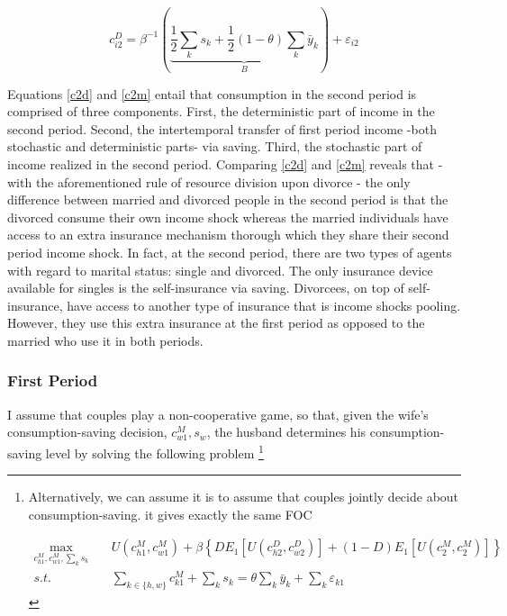 \begin{equation}
c_{i2}^D = \beta^{-1} \left ( \underbrace{\dfrac{1}{2} \sum_k s_k + \dfrac{1}{2} (1-\theta) \sum_k \bar y_k}_{B} \right ) + \varepsilon_{i2} 
\label{c2d}
\end{equation}

Equations \eqref{c2d} and \eqref{c2m} entail that consumption in the second period is comprised of three components. First, the deterministic part of income in the second period. Second, the intertemporal transfer of first period income -both stochastic and deterministic parts- via saving. Third, the stochastic part of income realized in the second period. Comparing \eqref{c2d} and \eqref{c2m}  reveals that - with the aforementioned rule of resource division upon divorce - the only difference between married and divorced people in the second period is that the divorced consume their own income shock whereas the married individuals have access to an extra insurance mechanism thorough which they share their second period income shock. In fact, at the second period, there are two types of agents with regard to marital status: single and divorced. The only insurance device available for singles is the self-insurance via saving. Divorcees, on top of self-insurance, have access to another type of insurance that is income shocks pooling. However, they use this extra insurance at the first period as opposed to the married who use it in both periods.  

\subsubsection{First Period}

I assume that couples play a non-cooperative game, so that, given the wife's consumption-saving decision, $c_{w1}^M, s_w$, the husband determines his consumption-saving level by solving the following problem \footnote{Alternatively, we can assume it is to assume that couples jointly decide about consumption-saving. it gives exactly the same FOC 

\begin{align*}
\max_{c_{h1}^M, c_{w1}^M, \sum_{k} s_k} \quad  &U(c_{h1}^M, c_{w1}^M) + \beta \left \{ D E_1[ U(c^D_{h2}, c^D_{w2})] + (1-D) E_1 [U(c_{2}^M, c_{2}^M)] \right \}  \\
s.t. &\sum_{k \in \{h,w\}} c^M_{k1} + \sum_k s_k = \theta \sum_k \bar y_k + \sum_k \varepsilon_{k1}
\end{align*}

}



